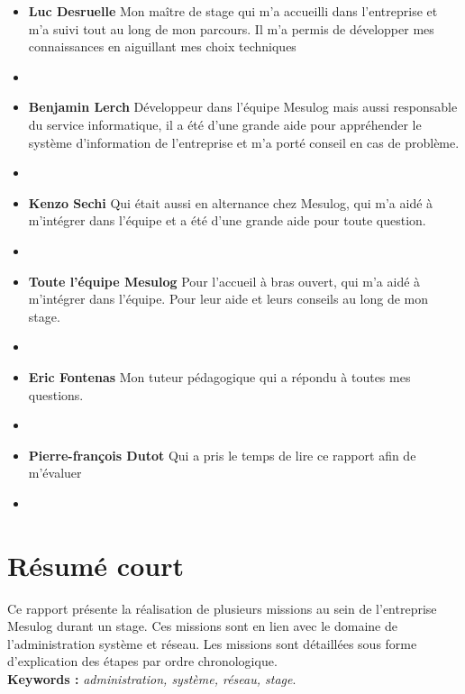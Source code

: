 \documentclass[a4paper, 11pt]{article}
\begin{document}
\begin{itemize}
\item[$\bullet$] \textbf{Luc Desruelle} Mon maître de stage qui m'a accueilli dans l'entreprise et m'a suivi tout au long de mon parcours. Il m'a permis de développer mes connaissances en aiguillant mes choix techniques
\item[] 

\item[$\bullet$] \textbf{Benjamin Lerch} Développeur dans l'équipe Mesulog mais aussi responsable du service informatique, il a été d'une grande aide pour appréhender le système d'information de l'entreprise et m'a porté conseil en cas de problème.
\item[] 

\item[$\bullet$] \textbf{Kenzo Sechi} Qui était aussi en alternance chez Mesulog, qui m'a aidé à m'intégrer dans l'équipe et a été d'une grande aide pour toute question.
\item[] 

\item[$\bullet$] \textbf{Toute l'équipe Mesulog} Pour l’accueil à bras ouvert, qui m'a aidé à m'intégrer dans l'équipe. Pour leur aide et leurs conseils au long de mon stage.
\item[]

\item[$\bullet$] \textbf{Eric Fontenas} Mon tuteur pédagogique qui a répondu à toutes mes questions.
\item[] 

\item[$\bullet$] \textbf{Pierre-françois Dutot} Qui a pris le temps de lire ce rapport afin de m’évaluer
\item[] 

\end{itemize}
\vspace{\baselineskip} %
\newpage
\thispagestyle{empty}
\tableofcontents
\newpage
\thispagestyle{empty} 
\listoffigures
\thispagestyle{empty} 
\newpage

\section*{Résumé court}
Ce rapport présente la réalisation de plusieurs missions au sein de l'entreprise Mesulog durant un stage. Ces missions sont en lien avec le domaine de l'administration système et réseau. Les missions sont détaillées sous forme d'explication des étapes par ordre chronologique.\\
\textbf{Keywords :} \textit{administration, système, réseau, stage}.
\thispagestyle{empty} 
\par\bigskip
\end{document}
